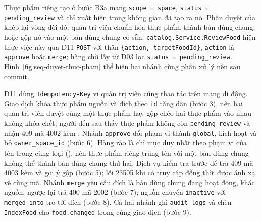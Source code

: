 Thực phẩm riêng tạo ở  bước B3a mang \texttt{scope = space}, \texttt{status = pending\_review} và chỉ xuất hiện trong không gian đã tạo ra nó. Phần duyệt của  khép lại vòng đời đó: quản trị viên chuẩn hóa thực phẩm thành bản dùng chung, hoặc gộp nó vào một bản dùng chung có sẵn. \texttt{catalog.Service.ReviewFood} hiện thực việc này qua D11 \texttt{POST}  với thân \texttt{\{action, targetFoodId\}}, \texttt{action} là \texttt{approve} hoặc \texttt{merge}; hàng chờ lấy từ D03 lọc \texttt{status = pending\_review}. Hình~\ref{fig:seq-duyet-thuc-pham} thể hiện hai nhánh cùng phần xử lý nền sau commit.


D11 dùng \texttt{Idempotency-Key} vì quản trị viên cũng thao tác trên mạng di động. Giao dịch khóa thực phẩm nguồn và đích theo \texttt{id} tăng dần (bước 3), nên hai quản trị viên duyệt cùng một thực phẩm hay gộp chéo hai thực phẩm vào nhau không khóa chết; người đến sau thấy thực phẩm không còn \texttt{pending\_review} và nhận 409 mã 4002 kèm . Nhánh \texttt{approve} đổi phạm vi thành \texttt{global}, kích hoạt và bỏ \texttt{owner\_space\_id} (bước 6). Hàng rào là chỉ mục duy nhất theo phạm vi của tên trong cùng loại (), nên thực phẩm riêng trùng tên với một bản dùng chung không thể thành bản dùng chung thứ hai. Dịch vụ kiểm tra trước để trả 409 mã 4003 kèm  và gợi ý gộp (bước 5); lỗi 23505 khi có truy cập đồng thời được ánh xạ về cùng mã. Nhánh \texttt{merge} yêu cầu đích là bản dùng chung đang hoạt động, khác nguồn, ngược lại trả 400 mã 2002 (bước 7); nguồn chuyển \texttt{inactive} với \texttt{merged\_into} trỏ tới đích (bước 8). Cả hai nhánh ghi \texttt{audit\_logs} và chèn \texttt{IndexFood} cho \texttt{food.changed} trong cùng giao dịch (bước 9).

